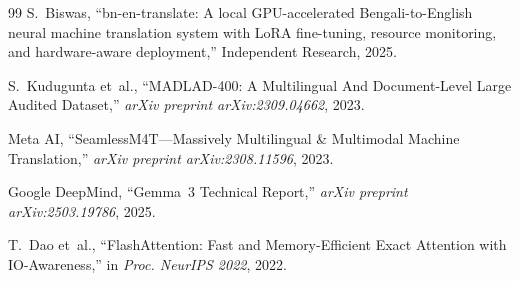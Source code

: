 \documentclass[conference]{IEEEtran}
\begin{document}
\begin{thebibliography}{99}
S.~Biswas,
``bn-en-translate: A local GPU-accelerated Bengali-to-English neural
machine translation system with LoRA fine-tuning, resource monitoring,
and hardware-aware deployment,''
Independent Research, 2025.

S.~Kudugunta et~al.,
``MADLAD-400: A Multilingual And Document-Level Large Audited Dataset,''
\textit{arXiv preprint arXiv:2309.04662}, 2023.

Meta AI,
``SeamlessM4T---Massively Multilingual \& Multimodal Machine Translation,''
\textit{arXiv preprint arXiv:2308.11596}, 2023.

Google DeepMind,
``Gemma~3 Technical Report,''
\textit{arXiv preprint arXiv:2503.19786}, 2025.

T.~Dao et~al.,
``FlashAttention: Fast and Memory-Efficient Exact Attention with IO-Awareness,''
in \textit{Proc. NeurIPS 2022}, 2022.

\end{thebibliography}
\end{document}
